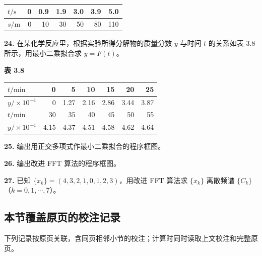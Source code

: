 \documentclass[
  10pt,
  fontset=fandol]{ctexart}
\newcounter{none} %
\begin{document}
{\def\LTcaptype{none} %
\begin{longtable}[]{@{}lrrrrrr@{}}
\toprule\noalign{}
\(t/\mathrm s\) & 0 & 0.9 & 1.9 & 3.0 & 3.9 & 5.0 \\
\midrule\noalign{}
\endhead
\bottomrule\noalign{}
\endlastfoot
\(s/\mathrm m\) & 0 & 10 & 30 & 50 & 80 & 110 \\
\end{longtable}
}

\textbf{24.} 在某化学反应里，根据实验所得分解物的质量分数 \(y\) 与时间 \(t\) 的关系如表 3.8 所示，用最小二乘拟合求 \(y=F(t)\)。

\textbf{表 3.8}

{\def\LTcaptype{none} %
\begin{longtable}[]{@{}lrrrrrr@{}}
\toprule\noalign{}
\(t/\mathrm{min}\) & 0 & 5 & 10 & 15 & 20 & 25 \\
\midrule\noalign{}
\endhead
\bottomrule\noalign{}
\endlastfoot
\(y/\times10^{-4}\) & 0 & 1.27 & 2.16 & 2.86 & 3.44 & 3.87 \\
\(t/\mathrm{min}\) & 30 & 35 & 40 & 45 & 50 & 55 \\
\(y/\times10^{-4}\) & 4.15 & 4.37 & 4.51 & 4.58 & 4.62 & 4.64 \\
\end{longtable}
}

\textbf{25.} 编出用正交多项式作最小二乘拟合的程序框图。

\textbf{26.} 编出改进 FFT 算法的程序框图。

\textbf{27.} 已知 \(\{x_k\}=(4,\allowbreak 3,\allowbreak 2,\allowbreak 1,\allowbreak 0,\allowbreak 1,\allowbreak 2,\allowbreak 3)\)，用改进 FFT 算法求 \(\{x_k\}\) 离散频谱 \(\{C_k\}\)（\(k=0,1,\cdots,7\)）。

\subsection{本节覆盖原页的校注记录}\label{ux672cux8282ux8986ux76d6ux539fux9875ux7684ux6821ux6ce8ux8bb0ux5f55}

下列记录按原页关联，含同页相邻小节的校注；计算时同时读取上文校注和完整原页。
\end{document}
